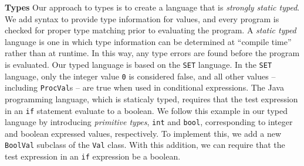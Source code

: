 \begin{minipage}[t]{\sw}
\slidenumber
\LARGE
{\bf Types}\exx
Our approach to types is to create a language that is
{\em strongly static typed}.
We add syntax to provide type information for values,
and every program is checked
for proper type matching prior
to evaluating the program.
A {\em static typed} language is one in which type information 
can be determined at ``compile time'' rather than at runtime.
In this way, any type errors are found
before the program is evaluated.\exx
Our typed language is based on the \verb'SET' language.
In the \verb'SET' language,
only the integer value \verb'0' is considered false,
and all other values -- including \verb'ProcVal's -- are true
when used in conditional expressions.
The Java programming language, which is staticaly typed,
requires that the test expression
in an \verb'if' statement evaluate to a boolean.
We follow this example in our typed language
by introducing {\em primitive types}, \verb'int' and \verb'bool',
corresponding to integer and boolean expressed values, respectively.
To implement this, we add a new \verb'BoolVal' subclass
of the \verb'Val' class.
With this addition, we can require that the test expression
in an \verb'if' expression be a boolean.\exx
\end{minipage}
